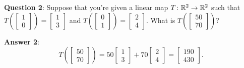 \begin{itemize}
	\ii \textbf{Question 2}:
	Suppose that you're given a linear map $T \colon \mathbb R^2 \to \mathbb R^2$ such that
	$T\left( \left[ \begin{smallmatrix} 1 \\ 0 \end{smallmatrix} \right] \right)
	= \left[ \begin{smallmatrix} 1 \\ 3 \end{smallmatrix} \right]$
	and
	$T\left( \left[ \begin{smallmatrix} 0 \\ 1 \end{smallmatrix} \right] \right)
	= \left[ \begin{smallmatrix} 2 \\ 4 \end{smallmatrix} \right]$.
	What is
	$T\left( \left[ \begin{smallmatrix} 50 \\ 70 \end{smallmatrix} \right] \right)$?

	\textbf{Answer 2}:
	\[
		T\left( \begin{bmatrix} 50 \\ 70 \end{bmatrix} \right)
		= 50 \begin{bmatrix} 1 \\ 3 \end{bmatrix}
		+ 70 \begin{bmatrix} 2 \\4 \end{bmatrix}
		= \begin{bmatrix} 190 \\ 430 \end{bmatrix}.
	\]
\end{itemize}

